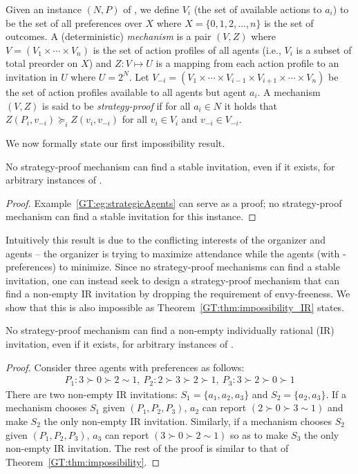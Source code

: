 \begin{definition} \label{GT:def:mechanism}
Given an instance $(N, P)$ of \ASIP, we define $V_i$ (the set of available actions to $a_i$) to be the set of all preferences over $X$ where $X = \{0, 1, 2, \dots, n\}$ is the set of outcomes. 
A (deterministic) \emph{mechanism} is a pair $(V, Z)$ where $V = (V_1 \times \cdots \times V_n)$ is the set of action profiles of all agents (i.e., $V_i$ is a subset of total preorder on $X$) and $Z: V \mapsto U$ is a mapping from each action profile to an invitation in $U$ where $U = 2^{N}$. 
Let $V_{-i} = (V_1 \times \cdots \times V_{i-1} \times V_{i+1} \times \cdots \times V_{n})$ be the set of action profiles available to all agents but agent $a_i$. A mechanism $(V, Z)$ is said to be \emph{strategy-proof} if for all $a_i\in N$ it holds that $Z(P_i, v_{-i}) \succeq_i Z(v_i, v_{-i})$ for all $v_i \in V_i$ and $v_{-i} \in V_{-i}$.
\end{definition}
We now formally state our first impossibility result.
\begin{theorem} \label{GT:thm:impossibility}
No strategy-proof mechanism can find a stable invitation, even if it exists, for arbitrary instances of \ASIP.
\end{theorem}
\begin{proof}
Example~\ref{GT:eg:strategicAgents} can serve as a proof; no strategy-proof mechanism can find a stable invitation for this instance.  
\end{proof}
Intuitively this result is due to the conflicting interests of the organizer and agents -- the organizer is trying to maximize attendance while the agents (with \DEC-preferences) to minimize. 
Since no strategy-proof mechanisms can find a stable invitation, 
one can instead seek to design a strategy-proof mechanism that can find a non-empty IR invitation 
by dropping the requirement of envy-freeness.
We show that this is also impossible as Theorem~\ref{GT:thm:impossibility_IR} states.

\begin{theorem} \label{GT:thm:impossibility_IR}
	No strategy-proof mechanism can find a non-empty individually rational (IR) invitation, even if it exists, for arbitrary instances of \ASIP. 
\end{theorem}
\begin{proof}
Consider three agents with preferences as follows:
\begin{equation*}
	\begin{aligned}
			P_1: 3\succ 0 \succ 2 \sim 1,~ P_2: 2 \succ 3 \succ 2 \succ 1, ~ P_3: 3 \succ 2 \succ 0 \succ 1
	\end{aligned}
\end{equation*}
There are two non-empty IR invitations: $S_1 = \{a_1, a_2, a_3\}$ and $S_2 = \{a_2, a_3\}$. 
If a mechanism chooses $S_1$ given $(P_1, P_2, P_3)$, $a_2$ can report $(2 \succ 0 \succ 3 \sim 1)$ and make $S_2$ the only non-empty IR invitation. Similarly, if a mechanism chooses $S_2$ given $(P_1, P_2, P_3)$, $a_3$ can report $(3 \succ 0 \succ 2 \sim 1)$ so as to make $S_3$ the only non-empty IR invitation. The rest of the proof is similar to that of Theorem~\ref{GT:thm:impossibility}.
\end{proof}

